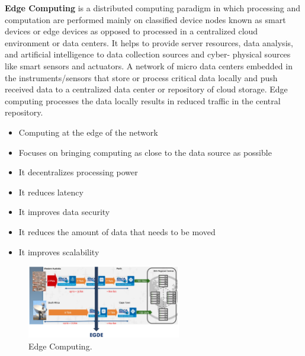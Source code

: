 \textbf{Edge Computing} is a distributed
computing paradigm in which
processing and computation are
performed mainly on classified
device nodes known as smart
devices or edge devices as
opposed to processed in a
centralized cloud environment or
data centers. It helps to provide server
resources, data analysis, and
artificial intelligence to data
collection sources and cyber-
physical sources like smart
sensors and actuators.
A network of micro data centers embedded in the
instruments/sensors that store or process critical data
locally and push received data to a centralized data center
or repository of cloud storage. Edge computing processes the data locally results in
reduced traffic in the central repository.

\begin{itemize}
    \item Computing at the edge of the network
    \item Focuses on bringing computing as close to the data source as possible
    \item It decentralizes processing power
    \item It reduces latency
    \item It improves data security
    \item It reduces the amount of data that needs to be moved
    \item It improves scalability
\end{itemize}

\begin{figure}[H]
    \centering
    \includegraphics[width=0.6\textwidth]{assets/fig9.png}
    \caption{Edge Computing.}
    \label{fig:9}
\end{figure}








    
